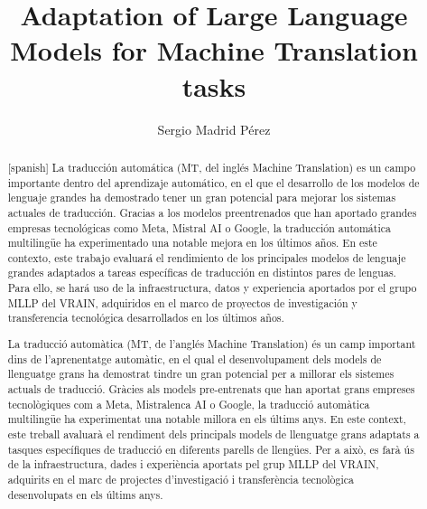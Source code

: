 \documentclass[11pt,english,listoffigures,listoftables]{tfgetsinf}
\title{Adaptation of Large Language Models for Machine Translation tasks}
\author{Sergio Madrid Pérez}
\begin{document}

\begin{abstract}[spanish]
La traducción automática (MT, del inglés Machine Translation) es un campo importante dentro del aprendizaje automático, en el que el desarrollo de los modelos de lenguaje grandes ha demostrado tener un gran potencial para mejorar los sistemas actuales de traducción. Gracias a los modelos preentrenados que han aportado grandes empresas tecnológicas como Meta, Mistral AI o Google, la traducción automática multilingüe ha experimentado una notable mejora en los últimos años. En este contexto, este trabajo evaluará el rendimiento de los principales modelos de lenguaje grandes adaptados a tareas específicas de traducción en distintos pares de lenguas. Para ello, se hará uso de la infraestructura, datos y experiencia aportados por el grupo MLLP del VRAIN, adquiridos en el marco de proyectos de investigación y transferencia tecnológica desarrollados en los últimos años. 

\end{abstract}

\clearpage

\begin{abstract}
La traducció automàtica (MT, de l'anglés Machine Translation) és un camp important dins de l'aprenentatge automàtic, en el qual el desenvolupament dels models de llenguatge grans ha demostrat tindre un gran potencial per a millorar els sistemes actuals de traducció. Gràcies als models pre-entrenats que han aportat grans empreses tecnològiques com a Meta, Mistralenca AI o Google, la traducció automàtica multilingüe ha experimentat una notable millora en els últims anys. En este context, este treball avaluarà el rendiment dels principals models de llenguatge grans adaptats a tasques específiques de traducció en diferents parells de llengües. Per a això, es farà ús de la infraestructura, dades i experiència aportats pel grup MLLP del VRAIN, adquirits en el marc de projectes d'investigació i transferència tecnològica desenvolupats en els últims anys. 
\end{abstract}

\clearpage
\end{document}
